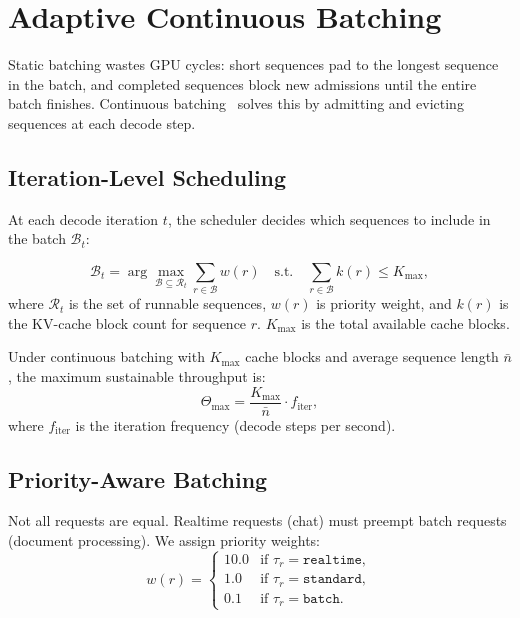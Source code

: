 \section{Adaptive Continuous Batching}

\label{sec:batching}

Static batching wastes GPU cycles: short sequences pad to the longest sequence
in the batch, and completed sequences block new admissions until the entire
batch finishes. Continuous batching~\cite{orca2022} solves this by admitting and
evicting sequences at each decode step.

\subsection{Iteration-Level Scheduling}

At each decode iteration $t$, the scheduler decides which sequences to include
in the batch $\mathcal{B}_t$:

\begin{equation}
\mathcal{B}_t = \arg\max_{\mathcal{B} \subseteq \mathcal{R}_t}
\sum_{r \in \mathcal{B}} w(r) \quad \text{s.t.} \quad
\sum_{r \in \mathcal{B}} k(r) \leq K_{\max},
\label{eq:batch}
\end{equation}
where $\mathcal{R}_t$ is the set of runnable sequences, $w(r)$ is priority
weight, and $k(r)$ is the KV-cache block count for sequence $r$.
$K_{\max}$ is the total available cache blocks.

\begin{proposition}
Under continuous batching with $K_{\max}$ cache blocks and average sequence
length $\bar{n}$, the maximum sustainable throughput is:
\begin{equation}
\Theta_{\max} = \frac{K_{\max}}{\bar{n}} \cdot f_{\text{iter}},
\end{equation}
where $f_{\text{iter}}$ is the iteration frequency (decode steps per second).
\end{proposition}

\subsection{Priority-Aware Batching}

Not all requests are equal. Realtime requests (chat) must preempt batch
requests (document processing). We assign priority weights:
\begin{equation}
w(r) = \begin{cases}
    10.0 & \text{if } \tau_r = \texttt{realtime}, \\
    1.0 & \text{if } \tau_r = \texttt{standard}, \\
    0.1 & \text{if } \tau_r = \texttt{batch}.
\end{cases}
\end{equation}

